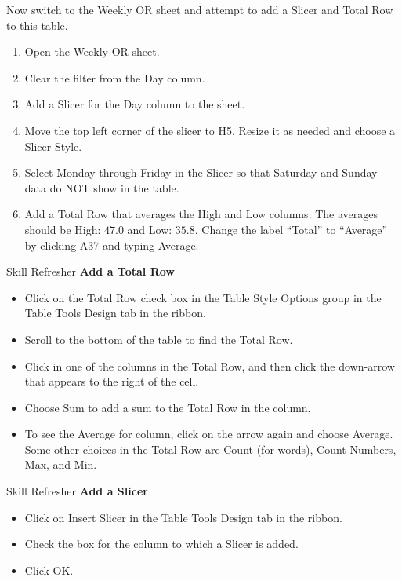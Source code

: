 Now switch to the Weekly OR sheet and attempt to add a Slicer and Total Row to this table.

\begin{enumerate}
	\item Open the Weekly OR sheet.
	\item Clear the filter from the Day column.
	\item Add a Slicer for the Day column to the sheet.
	\item Move the top left corner of the slicer to H5. Resize it as needed and choose a Slicer Style.
	\item Select Monday through Friday in the Slicer so that Saturday and Sunday data do NOT show in the table.
	\item Add a Total Row that averages the High and Low columns. The averages should be High: $ 47.0 $ and Low: $ 35.8 $. Change the label ``Total'' to ``Average'' by clicking A37 and typing Average.
\end{enumerate}

\begin{center}
	\begin{sklbox}{Skill Refresher}
		\textbf{Add a Total Row}
		\\
		\begin{itemize}
			\setlength{\itemsep}{0pt}
			\setlength{\parskip}{0pt}
			\setlength{\parsep}{0pt}

			\item Click on the Total Row check box in the Table Style Options group in the Table Tools Design tab in the ribbon.
			\item Scroll to the bottom of the table to find the Total Row.
			\item Click in one of the columns in the Total Row, and then click the down-arrow that appears to the right of the cell.
			\item Choose Sum to add a sum to the Total Row in the column.
			\item To see the Average for column, click on the arrow again and choose Average. Some other choices in the Total Row are Count (for words), Count Numbers, Max, and Min.
			
		\end{itemize}
	\end{sklbox}
\end{center}

\begin{center}
	\begin{sklbox}{Skill Refresher}
		\textbf{Add a Slicer}
		\\
		\begin{itemize}
			\setlength{\itemsep}{0pt}
			\setlength{\parskip}{0pt}
			\setlength{\parsep}{0pt}

			\item Click on Insert Slicer in the Table Tools Design tab in the ribbon.
			\item Check the box for the column to which a Slicer is added.
			\item Click OK.
			
		\end{itemize}
	\end{sklbox}
\end{center}

